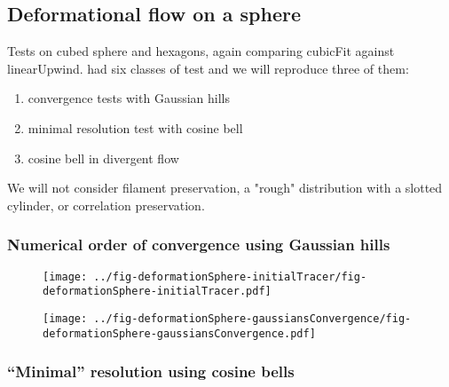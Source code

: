 \subsection{Deformational flow on a sphere}


Tests on cubed sphere and hexagons, again comparing cubicFit against linearUpwind.  \citet{lauritzen2012} had six classes of test and we will reproduce three of them:
\begin{enumerate}
	\item convergence tests with Gaussian hills
	\item minimal resolution test with cosine bell
	\item cosine bell in divergent flow
\end{enumerate}
We will not consider filament preservation, a "rough" distribution with a slotted cylinder, or correlation preservation.

\subsubsection{Numerical order of convergence using Gaussian hills}
\begin{figure}
	\centering
	\texttt{[image: ../fig-deformationSphere-initialTracer/fig-deformationSphere-initialTracer.pdf]}
	\caption{}
\end{figure}

\begin{figure}
	\centering
	\texttt{[image: ../fig-deformationSphere-gaussiansConvergence/fig-deformationSphere-gaussiansConvergence.pdf]}
	\caption{}
\end{figure}

\subsubsection{``Minimal'' resolution using cosine bells}

